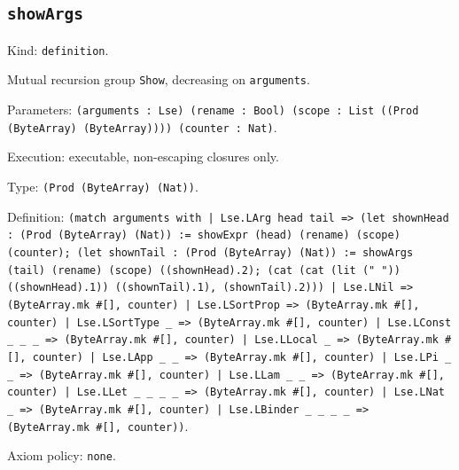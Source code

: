 \documentclass[11pt]{article}
\begin{document}
\subsection*{\texttt{showArgs}}
\noindent Kind: \texttt{definition}.\par
\noindent Mutual recursion group \texttt{Show}, decreasing on \texttt{arguments}.\par
\noindent Parameters: \texttt{(arguments : Lse) (rename : Bool) (scope : List ((Prod (ByteArray) (ByteArray)))) (counter : Nat)}.\par
\noindent Execution: executable, non-escaping closures only.\par
\noindent Type: \texttt{(Prod (ByteArray) (Nat))}.\par
\noindent Definition: \texttt{(match arguments with | Lse.LArg head tail => (let shownHead : (Prod (ByteArray) (Nat)) := showExpr (head) (rename) (scope) (counter); (let shownTail : (Prod (ByteArray) (Nat)) := showArgs (tail) (rename) (scope) ((shownHead).2); (cat (cat (lit (" ")) ((shownHead).1)) ((shownTail).1), (shownTail).2))) | Lse.LNil => (ByteArray.mk \#[], counter) | Lse.LSortProp => (ByteArray.mk \#[], counter) | Lse.LSortType \_ => (ByteArray.mk \#[], counter) | Lse.LConst \_ \_ \_ => (ByteArray.mk \#[], counter) | Lse.LLocal \_ => (ByteArray.mk \#[], counter) | Lse.LApp \_ \_ => (ByteArray.mk \#[], counter) | Lse.LPi \_ \_ => (ByteArray.mk \#[], counter) | Lse.LLam \_ \_ => (ByteArray.mk \#[], counter) | Lse.LLet \_ \_ \_ \_ => (ByteArray.mk \#[], counter) | Lse.LNat \_ => (ByteArray.mk \#[], counter) | Lse.LBinder \_ \_ \_ \_ => (ByteArray.mk \#[], counter))}.\par
\noindent Axiom policy: \texttt{none}.\par
\end{document}

